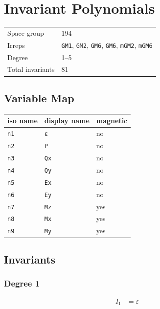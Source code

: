 \documentclass{article}
\begin{document}
\section*{Invariant Polynomials}

\begin{tabular}{ll}
\toprule
Space group & 194 \\
Irreps & \texttt{GM1\textplus{}}, \texttt{GM2\textminus{}}, \texttt{GM6\textminus{}}, \texttt{GM6\textminus{}}, \texttt{mGM2\textplus{}}, \texttt{mGM6\textplus{}} \\
Degree & 1--5 \\
Total invariants & 81 \\
\bottomrule
\end{tabular}

\subsection*{Variable Map}

\begin{tabular}{lll}
\toprule
iso name & display name & magnetic \\
\midrule
\texttt{n1} & \texttt{ε} & no \\
\texttt{n2} & \texttt{P} & no \\
\texttt{n3} & \texttt{Qx} & no \\
\texttt{n4} & \texttt{Qy} & no \\
\texttt{n5} & \texttt{Ex} & no \\
\texttt{n6} & \texttt{Ey} & no \\
\texttt{n7} & \texttt{Mz} & yes \\
\texttt{n8} & \texttt{Mx} & yes \\
\texttt{n9} & \texttt{My} & yes \\
\bottomrule
\end{tabular}

\subsection*{Invariants}

\subsubsection*{Degree 1}

\begin{align*}
I_{1} &= ε \\
\end{align*}
\end{document}

